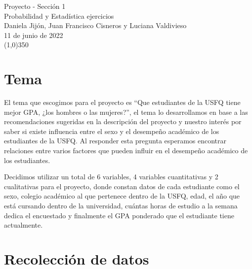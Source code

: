 \documentclass[25pt]{article}
\begin{document}
\linespread{1.25}
\begin{center}
 	{\Huge Proyecto - Sección 1}\\
	 \vspace{0.75cm}
	 {\large Probabilidad y Estadística ejercicios}\\
	 \vspace{0.5cm}
 	{\large Daniela Jijón, Juan Francisco Cisneros y Luciana Valdivieso}\\
	\vspace{0.5cm}
 	{\large 11 de junio de 2022}\\
 	\line(1,0){350}\\
	\end{center}
	
\section*{Tema}

El tema que escogimos para el proyecto es “Que estudiantes de la USFQ tiene mejor GPA, ¿los hombres o las mujeres?”, el tema lo desarrollamos en base a las recomendaciones sugeridas en la descripción del proyecto y nuestro interés por saber si existe influencia entre el sexo y el desempeño académico de los estudiantes de la USFQ. Al responder esta pregunta esperamos encontrar relaciones entre varios factores que pueden influir en el desempeño académico de los estudiantes.\par
\vspace{0.25cm}
Decidimos utilizar un total de 6 variables, 4 variables cuantitativas y 2 cualitativas para el proyecto, donde constan datos de cada estudiante como el sexo, colegio académico al que pertenece dentro de la USFQ, edad, el año que está cursando dentro de la universidad, cuántas horas de estudio a la semana dedica el encuestado y finalmente el GPA ponderado que el estudiante tiene actualmente.\par

\section*{Recolección de datos}
\end{document}
